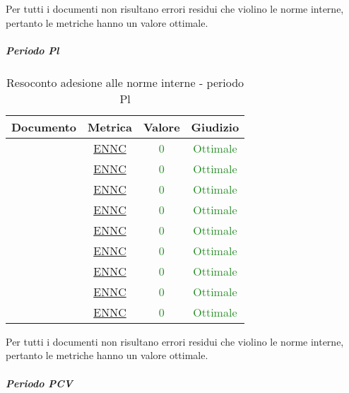 							Per tutti i documenti non risultano errori residui che violino le norme interne, pertanto le metriche hanno un valore ottimale.
						
						
						\subparagraph{Periodo Pl}
						
						\begin{table}[H]
							\centering
							\small
							\begin{tabular}{c | c | c | c}
								\hline
								\textbf{Documento} & \textbf{Metrica} & \textbf{Valore} & \textbf{Giudizio} \\
								\hline
								\pdpvdue     & \hyperref[MLEC]{ENNC}& \textcolor{ForestGreen}{0} & \textcolor{ForestGreen}{Ottimale} \\
								\pdqvdue     & \hyperref[MLEC]{ENNC}& \textcolor{ForestGreen}{0} & \textcolor{ForestGreen}{Ottimale} \\
								\ndpvdue     & \hyperref[MLEC]{ENNC} & \textcolor{ForestGreen}{0} & \textcolor{ForestGreen}{Ottimale} \\
								\adrvdue     & \hyperref[MLEC]{ENNC} & \textcolor{ForestGreen}{0} & \textcolor{ForestGreen}{Ottimale} \\
								\stvuno		& \hyperref[MLEC]{ENNC} & \textcolor{ForestGreen}{0} & \textcolor{ForestGreen}{Ottimale} \\
								\glvdue     & \hyperref[MLEC]{ENNC} & \textcolor{ForestGreen}{0} & \textcolor{ForestGreen}{Ottimale} \\
								\vcinquei       & \hyperref[MLEC]{ENNC} & \textcolor{ForestGreen}{0} & \textcolor{ForestGreen}{Ottimale} \\
								\vseii       & \hyperref[MLEC]{ENNC}& \textcolor{ForestGreen}{0} & \textcolor{ForestGreen}{Ottimale} \\
								\vtree       & \hyperref[MLEC]{ENNC} & \textcolor{ForestGreen}{0} & \textcolor{ForestGreen}{Ottimale} \\
								\hline
							\end{tabular}
							\caption{Resoconto adesione alle norme interne - periodo Pl}
							\label{tab_resoconto_adesione_alle_norme_interne_PPL}
						\end{table}

						Per tutti i documenti non risultano errori residui che violino le norme interne, pertanto le metriche hanno un valore ottimale.
						
						\subparagraph{Periodo PCV}
						
